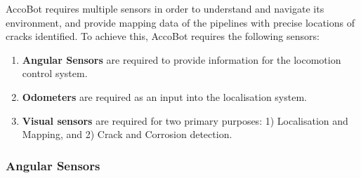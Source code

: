 \documentclass[11pt]{article}		%
\begin{document}
		AccoBot requires multiple sensors in order to understand and navigate its environment, and provide mapping data of the pipelines with precise locations of cracks identified. To achieve this, AccoBot requires the following sensors:
		
		\begin{enumerate}
		    \item \textbf{Angular Sensors} are required to provide information for the locomotion control system.
		    \item \textbf{Odometers} are required as an input into the localisation system.
		    \item \textbf{Visual sensors} are required for two primary purposes: 1) Localisation and Mapping, and 2) Crack and Corrosion detection. 
		\end{enumerate}
		
		\subsubsection{Angular Sensors}
            		
\end{document}
